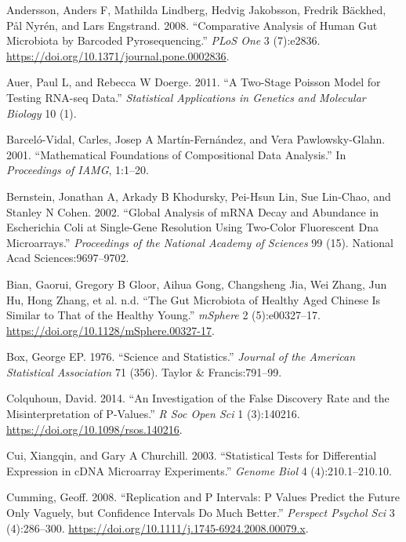 \documentclass[onecolumn]{book}
\theoremstyle{definition}
\theoremstyle{definition}
\theoremstyle{definition}
\theoremstyle{remark}
\begin{document}
\leavevmode\hypertarget{ref-Andersson:2008}{}%
Andersson, Anders F, Mathilda Lindberg, Hedvig Jakobsson, Fredrik
Bäckhed, Pål Nyrén, and Lars Engstrand. 2008. ``Comparative Analysis of
Human Gut Microbiota by Barcoded Pyrosequencing.'' \emph{PLoS One} 3
(7):e2836. \url{https://doi.org/10.1371/journal.pone.0002836}.

\leavevmode\hypertarget{ref-auer:2011}{}%
Auer, Paul L, and Rebecca W Doerge. 2011. ``A Two-Stage Poisson Model
for Testing RNA-seq Data.'' \emph{Statistical Applications in Genetics
and Molecular Biology} 10 (1).

\leavevmode\hypertarget{ref-barcelo:2001}{}%
Barceló-Vidal, Carles, Josep A Martín-Fernández, and Vera
Pawlowsky-Glahn. 2001. ``Mathematical Foundations of Compositional Data
Analysis.'' In \emph{Proceedings of IAMG}, 1:1--20.

\leavevmode\hypertarget{ref-mRNA:2002}{}%
Bernstein, Jonathan A, Arkady B Khodursky, Pei-Hsun Lin, Sue Lin-Chao,
and Stanley N Cohen. 2002. ``Global Analysis of mRNA Decay and Abundance
in Escherichia Coli at Single-Gene Resolution Using Two-Color
Fluorescent Dna Microarrays.'' \emph{Proceedings of the National Academy
of Sciences} 99 (15). National Acad Sciences:9697--9702.

\leavevmode\hypertarget{ref-bian:2017}{}%
Bian, Gaorui, Gregory B Gloor, Aihua Gong, Changsheng Jia, Wei Zhang,
Jun Hu, Hong Zhang, et al. n.d. ``The Gut Microbiota of Healthy Aged
Chinese Is Similar to That of the Healthy Young.'' \emph{mSphere} 2
(5):e00327--17. \url{https://doi.org/10.1128/mSphere.00327-17}.

\leavevmode\hypertarget{ref-box:1976}{}%
Box, George EP. 1976. ``Science and Statistics.'' \emph{Journal of the
American Statistical Association} 71 (356). Taylor \& Francis:791--99.

\leavevmode\hypertarget{ref-Colquhoun:2014aa}{}%
Colquhoun, David. 2014. ``An Investigation of the False Discovery Rate
and the Misinterpretation of P-Values.'' \emph{R Soc Open Sci} 1
(3):140216. \url{https://doi.org/10.1098/rsos.140216}.

\leavevmode\hypertarget{ref-Cui:2003aa}{}%
Cui, Xiangqin, and Gary A Churchill. 2003. ``Statistical Tests for
Differential Expression in cDNA Microarray Experiments.'' \emph{Genome
Biol} 4 (4):210.1--210.10.

\leavevmode\hypertarget{ref-Cumming:2008aa}{}%
Cumming, Geoff. 2008. ``Replication and P Intervals: P Values Predict
the Future Only Vaguely, but Confidence Intervals Do Much Better.''
\emph{Perspect Psychol Sci} 3 (4):286--300.
\url{https://doi.org/10.1111/j.1745-6924.2008.00079.x}.
\end{document}
